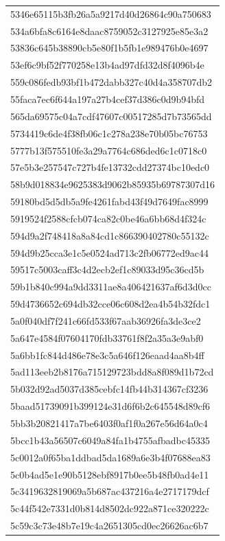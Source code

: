 \begin{tabular}{l}
5346e65115b3fb26a5a9217d40d26864c90a750683 \\
534a6bfa8c6164e8daac8759052c3127925e85e3a2 \\
53836c645b38890cb5e80f1b5fb1e989476b0e4697 \\
53ef6c9bf52f770258e13b4ad97dfd32d8f4096b4e \\
559c086fedb93bf1b472dabb327c40d4a358707db2 \\
55faca7ec6f644a197a27b4cef37d386c0d9b94bfd \\
565da69575c04a7cdf47607c00517285d7b73565dd \\
5734419c6de4f38fb06c1c278a238e70b05bc76753 \\
5777b13f575510fe3a29a7764c686ded6c1c0718c0 \\
57e5b3e257547c727b4fe13732cdd27374bc10edc0 \\
58b9d018834e9625383d9062b85935b69787307d16 \\
59180bd5d5db5a9fe4261fabd43f49d7649fac8999 \\
5919524f2588cfcb074ca82c0be46a6bb68d4f324c \\
594d9a2f748418a8a84cd1c866390402780c55132c \\
594d9b25cca3e1c5e0524ad713c2fb06772ed9ac44 \\
59517c5003caff3c4d2ecb2ef1c89033d95c36cd5b \\
59b1b840c994a9dd3311ae8a406421637af6d3d0cc \\
59d4736652c694db32cce06c608d2ea4b54b32fdc1 \\
5a0f040df7f241c66fd533f67aab36926fa3de3ce2 \\
5a647e4584f07604170fdb33761f8f2a35a3e9abf0 \\
5a6bb1fc844d486e78e3c5a646f126eaad4aa8b4ff \\
5ad113eeb2b8176a715129723bdd8a8f089d1b72cd \\
5b032d92ad5037d385cebfc14fb44b314367cf3236 \\
5baad51739091b399124e31d6f6b2c645548d89cf6 \\
5bb3b20821417a7be6403f0af1f0a267e56d64a0c4 \\
5bcc1b43a56507c6049a84fa1b4755afbadbc45335 \\
5c0012a0f65ba1ddbad5da1689a6e3b4f07688ea83 \\
5c0b4ad5e1e90b5128ebf8917b0ee5b48fb0ad4e11 \\
5c3419632819069a5b687ac437216a4e2717179dcf \\
5c44f542e7331d0b814d8502dc922a871ce320222c \\
5c59c3c73e48b7e19c4a2651305cd0ec26626ac6b7 \\

\end{tabular}
